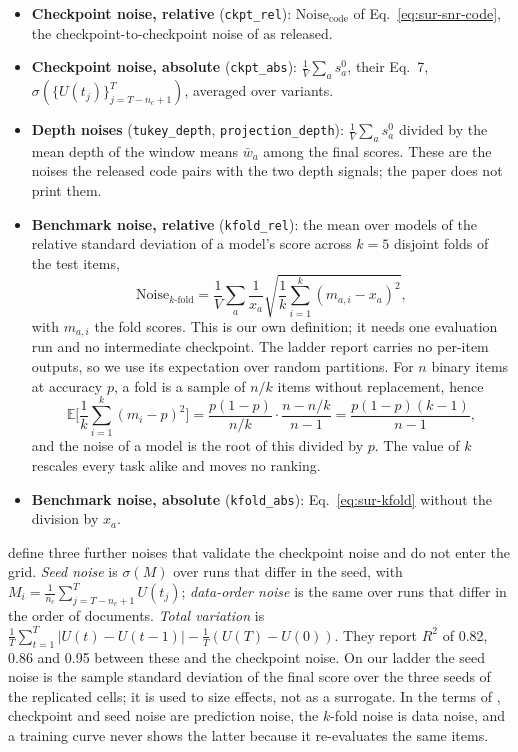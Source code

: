 \begin{itemize}[itemsep=1pt,topsep=2pt]
\item \textbf{Checkpoint noise, relative} (\texttt{ckpt\_rel}): $\text{Noise}_{\text{code}}$ of Eq.~\ref{eq:sur-snr-code}, the checkpoint-to-checkpoint noise of \citet{heineman_signal_2025} as released.
\item \textbf{Checkpoint noise, absolute} (\texttt{ckpt\_abs}): $\frac{1}{V}\sum_a s^0_a$, their Eq.~7, $\sigma(\{U(t_j)\}_{j=T-n_c+1}^{T})$, averaged over variants.
\item \textbf{Depth noises} (\texttt{tukey\_depth}, \texttt{projection\_depth}): $\frac{1}{V}\sum_a s^0_a$ divided by the mean depth of the window means $\bar{w}_a$ among the final scores. These are the noises the released code pairs with the two depth signals; the paper does not print them.
\item \textbf{Benchmark noise, relative} (\texttt{kfold\_rel}): the mean over models of the relative standard deviation of a model's score across $k = 5$ disjoint folds of the test items,
\begin{equation}
\text{Noise}_{k\text{-fold}} = \frac{1}{V}\sum_a \frac{1}{x_a}\sqrt{\frac{1}{k}\sum_{i=1}^{k}(m_{a,i} - x_a)^2},
\label{eq:sur-kfold}
\end{equation}
with $m_{a,i}$ the fold scores. This is our own definition; it needs one evaluation run and no intermediate checkpoint.
The ladder report carries no per-item outputs, so we use its expectation over random partitions. For $n$ binary items at accuracy $p$, a fold is a sample of $n/k$ items without replacement, hence
\begin{equation}
\mathbb{E}\Big[\frac{1}{k}\sum_{i=1}^{k}(m_i - p)^2\Big] = \frac{p(1-p)}{n/k}\cdot\frac{n - n/k}{n - 1} = \frac{p(1-p)(k-1)}{n-1},
\label{eq:sur-kfold-closed}
\end{equation}
and the noise of a model is the root of this divided by $p$. The value of $k$ rescales every task alike and moves no ranking.
\item \textbf{Benchmark noise, absolute} (\texttt{kfold\_abs}): Eq.~\ref{eq:sur-kfold} without the division by $x_a$.
\end{itemize}

\citet{heineman_signal_2025} define three further noises that validate the checkpoint noise and do not enter the grid.
\emph{Seed noise} is $\sigma(M)$ over runs that differ in the seed, with $M_i = \frac{1}{n_c}\sum_{j=T-n_c+1}^{T} U(t_j)$; \emph{data-order noise} is the same over runs that differ in the order of documents.
\emph{Total variation} is $\frac{1}{T}\sum_{t=1}^{T}|U(t) - U(t-1)| - \frac{1}{T}(U(T) - U(0))$.
They report $R^2$ of 0.82, 0.86 and 0.95 between these and the checkpoint noise.
On our ladder the seed noise is the sample standard deviation of the final score over the three seeds of the replicated cells; it is used to size effects, not as a surrogate.
In the terms of \citet{wang_measuring_2025}, checkpoint and seed noise are prediction noise, the $k$-fold noise is data noise, and a training curve never shows the latter because it re-evaluates the same items.

